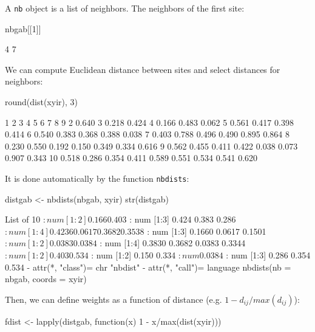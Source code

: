 \documentclass[a4paper]{article}
\begin{document}
A \texttt{nb} object is a list of neighbors. The neighbors of the first site:
\begin{Schunk}
\begin{Sinput}
 nbgab[[1]]
\end{Sinput}
\begin{Soutput}
[1] 4 7
\end{Soutput}
\end{Schunk}
We can compute Euclidean distance between sites and select distances for neighbors:
\begin{Schunk}
\begin{Sinput}
 round(dist(xyir), 3)
\end{Sinput}
\begin{Soutput}
       1     2     3     4     5     6     7     8     9
2  0.640                                                
3  0.218 0.424                                          
4  0.166 0.483 0.062                                    
5  0.561 0.417 0.398 0.414                              
6  0.540 0.383 0.368 0.388 0.038                        
7  0.403 0.788 0.496 0.490 0.895 0.864                  
8  0.230 0.550 0.192 0.150 0.349 0.334 0.616            
9  0.562 0.455 0.411 0.422 0.038 0.073 0.907 0.343      
10 0.518 0.286 0.354 0.411 0.589 0.551 0.534 0.541 0.620
\end{Soutput}
\end{Schunk}
It is done automatically by the function \texttt{nbdists}:
\begin{Schunk}
\begin{Sinput}
 distgab <- nbdists(nbgab, xyir)
 str(distgab)
\end{Sinput}
\begin{Soutput}
List of 10
 $ : num [1:2] 0.166 0.403
 $ : num [1:3] 0.424 0.383 0.286
 $ : num [1:4] 0.4236 0.0617 0.3682 0.3538
 $ : num [1:3] 0.1660 0.0617 0.1501
 $ : num [1:2] 0.0383 0.0384
 $ : num [1:4] 0.3830 0.3682 0.0383 0.3344
 $ : num [1:2] 0.403 0.534
 $ : num [1:2] 0.150 0.334
 $ : num 0.0384
 $ : num [1:3] 0.286 0.354 0.534
 - attr(*, "class")= chr "nbdist"
 - attr(*, "call")= language nbdists(nb = nbgab, coords = xyir)
\end{Soutput}
\end{Schunk}
Then, we can define weights as a function of distance (e.g. $1-d_{ij}/max(d_{ij})$):
\begin{Schunk}
\begin{Sinput}
 fdist <- lapply(distgab, function(x) 1 - x/max(dist(xyir)))
\end{Sinput}
\end{Schunk}
\end{document}
